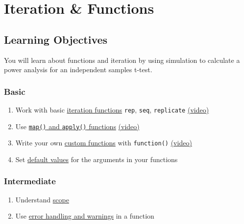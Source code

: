 \documentclass[
  oneside]{book}
\providecommand{\tightlist}{%
  \setlength{\itemsep}{0pt}\setlength{\parskip}{0pt}}
\begin{document}
\hypertarget{func}{%
\chapter{Iteration \& Functions}\label{func}}

\hypertarget{ilo-func}{%
\section{Learning Objectives}\label{ilo-func}}

You will learn about functions and iteration by using simulation to calculate a power analysis for an independent samples t-test.

\hypertarget{basic-5}{%
\subsection*{Basic}\label{basic-5}}

\begin{enumerate}
\def\labelenumi{\arabic{enumi}.}
\tightlist
\item
  Work with basic \protect\hyperlink{iteration-functions}{iteration functions} \texttt{rep}, \texttt{seq}, \texttt{replicate} \href{https://youtu.be/X3zFA71JzgE}{(video)}
\item
  Use \protect\hyperlink{map-apply}{\texttt{map()} and \texttt{apply()} functions} \href{https://youtu.be/HcZxQZwJ8T4}{(video)}
\item
  Write your own \protect\hyperlink{custom-functions}{custom functions} with \texttt{function()} \href{https://youtu.be/Qqjva0xgYC4}{(video)}
\item
  Set \protect\hyperlink{defaults}{default values} for the arguments in your functions
\end{enumerate}

\hypertarget{intermediate-5}{%
\subsection*{Intermediate}\label{intermediate-5}}

\begin{enumerate}
\def\labelenumi{\arabic{enumi}.}
\setcounter{enumi}{4}
\tightlist
\item
  Understand \protect\hyperlink{scope}{scope}
\item
  Use \protect\hyperlink{warnings-errors}{error handling and warnings} in a function
\end{enumerate}
\end{document}
